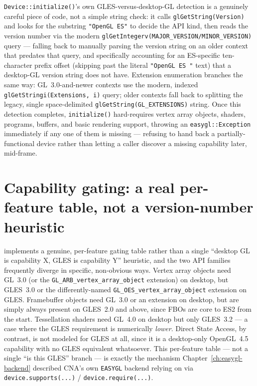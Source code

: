 \texttt{Device::initialize()}'s own GLES-versus-desktop-GL detection is a genuinely careful
piece of code, not a simple string check: it calls \texttt{glGetString(Version)} and looks
for the substring \texttt{"OpenGL ES"} to decide the API kind, then reads the version number
via the modern \texttt{glGetIntegerv(MAJOR\_VERSION/MINOR\_VERSION)} query --- falling back to
manually parsing the version string on an older context that predates that query, and
specifically accounting for an ES-specific ten-character prefix offset (skipping past the
literal \texttt{"OpenGL ES "} text) that a desktop-GL version string does not have. Extension
enumeration branches the same way: GL~3.0-and-newer contexts use the modern, indexed
\texttt{glGetStringi(Extensions, i)} query; older contexts fall back to splitting the legacy,
single space-delimited \texttt{glGetString(GL\_EXTENSIONS)} string. Once this detection
completes, \texttt{initialize()} hard-requires vertex array objects, shaders, programs,
buffers, and basic rendering support, throwing an \texttt{easygl::Exception} immediately if
any one of them is missing --- refusing to hand back a partially-functional device rather
than letting a caller discover a missing capability later, mid-frame.

\section{Capability gating: a real per-feature table, not a version-number heuristic}

 implements a genuine,
per-feature gating table rather than a single ``desktop GL is capability X, GLES is capability
Y'' heuristic, and the two API families frequently diverge in specific, non-obvious ways.
Vertex array objects need GL~3.0 (or the \texttt{GL\_ARB\_vertex\_array\_object} extension) on
desktop, but GLES~3.0 or the differently-named \texttt{GL\_OES\_vertex\_array\_object}
extension on GLES. Framebuffer objects need GL~3.0 or an extension on desktop, but are simply
always present on GLES~2.0 and above, since FBOs are core to ES2 from the start. Tessellation
shaders need GL~4.0 on desktop but only GLES~3.2 --- a case where the GLES requirement is
numerically \emph{lower}. Direct State Access, by contrast, is not modeled for GLES at all,
since it is a desktop-only OpenGL~4.5 capability with no GLES equivalent whatsoever. This
per-feature table --- not a single ``is this GLES'' branch --- is exactly the mechanism
Chapter~\ref{ch:easygl-backend} described CNA's own \texttt{EASYGL} backend
relying on via \texttt{device.supports(...)} / \texttt{device.require(...)}.


